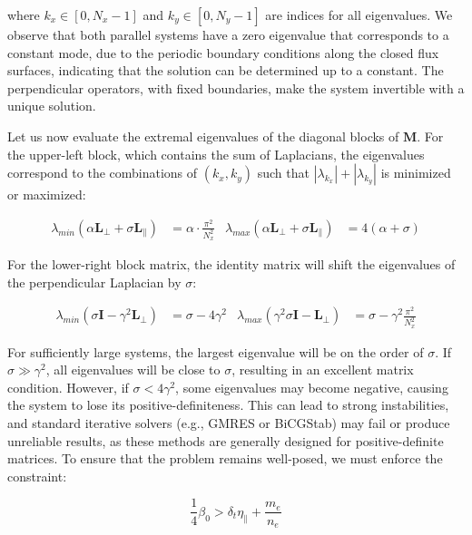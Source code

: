 where $k_x\in[0,N_x-1]$ and $k_y\in[0,N_y-1]$ are indices for all eigenvalues. We observe that both parallel systems have a zero eigenvalue that corresponds to a constant mode, due to the periodic boundary conditions along the closed flux surfaces, indicating that the solution can be determined up to a constant. The perpendicular operators, with fixed boundaries, make the system invertible with a unique solution. 

Let us now evaluate the extremal eigenvalues of the diagonal blocks of $\mathbf{M}$. For the upper-left block, which contains the sum of Laplacians, the eigenvalues correspond to the combinations of $(k_x,k_y)$ such that $|\lambda_{k_x}|+|\lambda_{k_y}|$ is minimized or maximized:

\begin{align}
	\lambda_{min}(\alpha \textbf{L}_\perp + \sigma \textbf{L}_\parallel) &= \alpha\cdot\frac{\pi^2}{N_x^2} & \lambda_{max}(\alpha \textbf{L}_\perp + \sigma \textbf{L}_\parallel) &= 4(\alpha + \sigma)
	\label{eq:Impl_EVupperLeftBlock}
\end{align}

For the lower-right block matrix, the identity matrix will shift the eigenvalues of the perpendicular Laplacian by $\sigma$:

\begin{align}
	\lambda_{min}(\sigma \textbf{I} - \gamma^2 \textbf{L}_\perp) &= \sigma - 4\gamma^2 & \lambda_{max}(\gamma^2 \sigma \textbf{I} - \textbf{L}_\perp ) &= \sigma - \gamma^2\frac{\pi^2}{N_x^2}
	\label{eq:Impl_EVlowerRightBlock}
\end{align}

For sufficiently large systems, the largest eigenvalue will be on the order of $\sigma$. If $\sigma \gg \gamma^2$, all eigenvalues will be close to $\sigma$, resulting in an excellent matrix condition. However, if $\sigma < 4\gamma^2$, some eigenvalues may become negative, causing the system to lose its positive-definiteness. This can lead to strong instabilities, and standard iterative solvers (e.g., GMRES or BiCGStab) may fail or produce unreliable results, as these methods are generally designed for positive-definite matrices. To ensure that the problem remains well-posed, we must enforce the constraint:

\begin{equation}
	\frac{1}{4}\beta_0 > \delta_t\eta_\parallel + \frac{m_e}{n_e} 
	\label{eq:Impl_conditionPositiveDefinite}
\end{equation}

